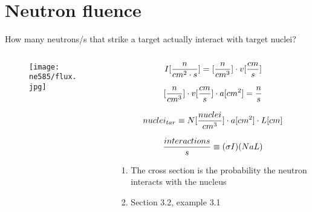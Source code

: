 \documentclass[aspectratio=1610,pdftex,dvipsnames,compress,xcolor={dvipsnames}]{beamer}
\begin{document}
\section{Neutron fluence}


\addtocounter{framenumber}{-1} 
\begin{frame}{How many neutrons/s that strike a target actually interact with target nuclei?}
    \begin{columns}[t]

        \begin{column}{0.55\textwidth}
            \begin{figure}
                \centering
                \texttt{[image: ne585/flux.jpg]}
            \end{figure}
        \end{column}

        \begin{column}{0.45\textwidth}
            \begin{equation}
                \small
                I[\frac{n}{cm^2 \cdot s}]=[\frac{n}{cm^3}] \cdot v[\frac{cm}{s}]
            \end{equation}

            \begin{equation}
                \small
                [\frac{n}{cm^3}] \cdot v[\frac{cm}{s}] \cdot a[cm^2]=\frac{n}{s}
            \end{equation}

            \begin{equation}
                \small
                nuclei_{tar} \equiv N[\frac{nuclei}{cm^3}] \cdot a[cm^2] \cdot L[cm]
            \end{equation}

            \begin{equation}
                \small
                \frac{interactions}{s} \equiv (\sigma I)(NaL)
            \end{equation}

            \vspace*{\fill}

            \begin{enumerate}[series=outerlist,topsep=0pt,itemsep=7pt,leftmargin=*,label=(\arabic*)]
                \item[]\small The cross section is the probability the neutron interacts with the nucleus
                \item[]\small Section 3.2, example 3.1 
            \end{enumerate}
        \end{column}

    \end{columns}
\end{frame}
\end{document}
